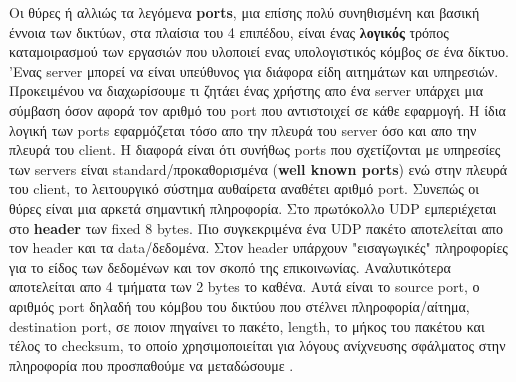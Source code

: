 \documentclass[hidelinks, 12pt, a4paper]{article}
\begin{document}
Οι θύρες ή αλλιώς τα λεγόμενα \textbf{ports}, μια επίσης πολύ συνηθισμένη και βασική έννοια των δικτύων, στα πλαίσια του 4 επιπέδου, είναι ένας \textbf{λογικός} τρόπος καταμοιρασμού των εργασιών που υλοποιεί ενας υπολογιστικός κόμβος σε ένα δίκτυο. 'Ενας server μπορεί να είναι υπεύθυνος για διάφορα είδη αιτημάτων και υπηρεσιών. Προκειμένου να διαχωρίσουμε τι ζητάει ένας χρήστης απο ένα server υπάρχει μια σύμβαση όσον αφορά τον αριθμό του port που αντιστοιχεί σε κάθε εφαρμογή. Η ίδια λογική των ports εφαρμόζεται τόσο απο την πλευρά του server όσο και απο την πλευρά του client. Η διαφορά είναι ότι συνήθως ports που σχετίζονται με υπηρεσίες των servers είναι standard/προκαθορισμένα (\textbf{well known ports}) ενώ στην πλευρά του client, το λειτουργικό σύστημα αυθαίρετα αναθέτει αριθμό port. Συνεπώς οι θύρες είναι μια αρκετά σημαντική πληροφορία. Στο πρωτόκολλο UDP εμπεριέχεται στο \textbf{header} των fixed 8 bytes. Πιο συγκεκριμένα ένα UDP πακέτο αποτελείται απο τον header και τα data/δεδομένα. Στον header υπάρχουν "εισαγωγικές" πληροφορίες για το είδος των δεδομένων και τον σκοπό της επικοινωνίας. Αναλυτικότερα αποτελείται απο 4 τμήματα των 2 bytes το καθένα. Αυτά είναι το source port, ο αριθμός port δηλαδή του κόμβου του δικτύου που στέλνει πληροφορία/αίτημα, destination port, σε ποιον πηγαίνει το πακέτο, length, το μήκος του πακέτου και τέλος το checksum, το οποίο χρησιμοποιείται για λόγους ανίχνευσης σφάλματος στην πληροφορία που προσπαθούμε να μεταδώσουμε \cite{wiki_udp, gfgudp}.
\end{document}
